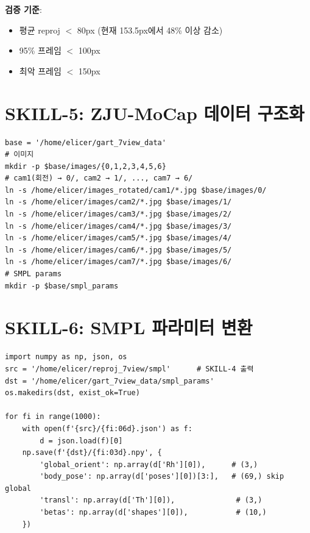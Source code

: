 \documentclass[11pt, a4paper]{report}
\begin{document}
\textbf{검증 기준}:
\begin{itemize}
\item 평균 reproj $<$ 80px (현재 153.5px에서 48\% 이상 감소)
\item 95\% 프레임 $<$ 100px
\item 최악 프레임 $<$ 150px
\end{itemize}


\section{SKILL-5: ZJU-MoCap 데이터 구조화}

\begin{codebox}[title={디렉토리 구조 생성}]
\begin{verbatim}
base = '/home/elicer/gart_7view_data'
# 이미지
mkdir -p $base/images/{0,1,2,3,4,5,6}
# cam1(회전) → 0/, cam2 → 1/, ..., cam7 → 6/
ln -s /home/elicer/images_rotated/cam1/*.jpg $base/images/0/
ln -s /home/elicer/images/cam2/*.jpg $base/images/1/
ln -s /home/elicer/images/cam3/*.jpg $base/images/2/
ln -s /home/elicer/images/cam4/*.jpg $base/images/3/
ln -s /home/elicer/images/cam5/*.jpg $base/images/4/
ln -s /home/elicer/images/cam6/*.jpg $base/images/5/
ln -s /home/elicer/images/cam7/*.jpg $base/images/6/
# SMPL params
mkdir -p $base/smpl_params
\end{verbatim}
\end{codebox}


\section{SKILL-6: SMPL 파라미터 변환}

\begin{codebox}[title={EasyMocap JSON $\to$ GART NPY}]
\begin{verbatim}
import numpy as np, json, os
src = '/home/elicer/reproj_7view/smpl'      # SKILL-4 출력
dst = '/home/elicer/gart_7view_data/smpl_params'
os.makedirs(dst, exist_ok=True)

for fi in range(1000):
    with open(f'{src}/{fi:06d}.json') as f:
        d = json.load(f)[0]
    np.save(f'{dst}/{fi:03d}.npy', {
        'global_orient': np.array(d['Rh'][0]),      # (3,)
        'body_pose': np.array(d['poses'][0])[3:],   # (69,) skip global
        'transl': np.array(d['Th'][0]),              # (3,)
        'betas': np.array(d['shapes'][0]),           # (10,)
    })
\end{verbatim}
\end{codebox}
\end{document}
